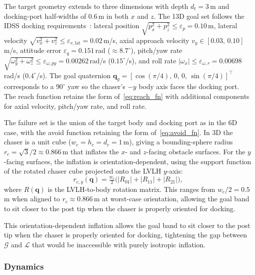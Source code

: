 \documentclass[letterpaper, 10 pt, conference]{ieeeconf}
\begin{document}
The target geometry extends to three dimensions with depth $d_t = 3$\,m and docking-port half-widths of $0.6$\,m in both $x$ and $z$. The 13D goal set follows the IDSS docking requirements~\cite{nasaidss}: lateral position $\sqrt{p_x^2+p_z^2} \leq \varepsilon_p = 0.10$\,m, lateral velocity $\sqrt{v_x^2+v_z^2} \leq \varepsilon_{v,\mathrm{lat}} = 0.02$\,m/s, axial approach velocity $v_y \in [0.03,\, 0.10]$\,m/s, attitude error $\varepsilon_q = 0.151$\,rad ($\approx 8.7^\circ$), pitch/yaw rate $\sqrt{\omega_y^2+\omega_z^2} \leq \varepsilon_{\omega,py} = 0.00262$\,rad/s ($0.15^\circ$/s), and roll rate $|\omega_x| \leq \varepsilon_{\omega,r} = 0.00698$\,rad/s ($0.4^\circ$/s). The goal quaternion $\mathbf{q}_g = [\cos(\pi/4),\, 0,\, 0,\, \sin(\pi/4)]^\top$ corresponds to a $90^\circ$ yaw so the chaser's $-y$ body axis faces the docking port. The reach function retains the form of~\eqref{eq:reach_fn} with additional components for axial velocity, pitch/yaw rate, and roll rate.

The failure set is the union of the target body and docking port as in the 6D case, with the avoid function retaining the form of~\eqref{eq:avoid_fn}. In 3D the chaser is a unit cube ($w_c = h_c = d_c = 1$\,m), giving a bounding-sphere radius $r_c = \sqrt{3}/2 \approx 0.866$\,m that inflates the $x$- and $z$-facing obstacle surfaces. For the $y$-facing surfaces, the inflation is orientation-dependent, using the support function of the rotated chaser cube projected onto the LVLH $y$-axis:
\begin{equation}\label{eq:cb_y}
r_{c,y}(\mathbf{q}) = \tfrac{w_c}{2}\bigl(|R_{01}| + |R_{11}| + |R_{21}|\bigr),
\end{equation}
where $R(\mathbf{q})$ is the LVLH-to-body rotation matrix. This ranges from $w_c/2 = 0.5$\,m when aligned to $r_c \approx 0.866$\,m at worst-case orientation, allowing the goal band to sit closer to the post tip when the chaser is properly oriented for docking.

This orientation-dependent inflation allows the goal band to sit closer to the post tip when the chaser is properly oriented for docking, tightening the gap between $\mathcal{G}$ and $\mathcal{L}$ that would be inaccessible with purely isotropic inflation.


\subsubsection{Dynamics}
\end{document}
